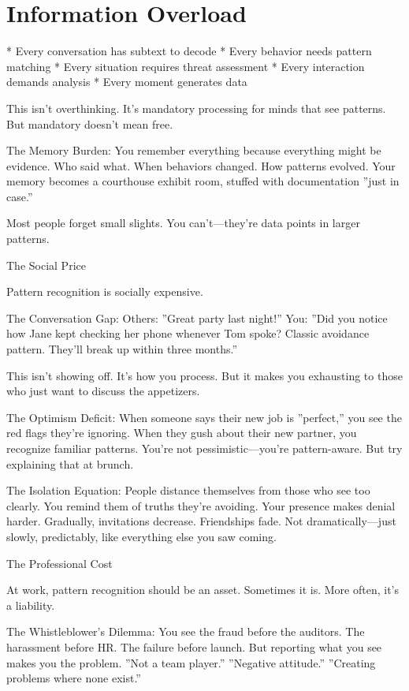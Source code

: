 \documentclass[12pt,oneside]{book}
\begin{document}
\section{Information Overload}

                    * Every conversation has subtext to decode
                    * Every behavior needs pattern matching
                    * Every situation requires threat assessment
                    * Every interaction demands analysis
                    * Every moment generates data

This isn't overthinking. It's mandatory processing for minds that see patterns. But mandatory doesn't mean free.

The Memory Burden: You remember everything because everything might be evidence. Who said what. When behaviors changed. How patterns evolved. Your memory becomes a courthouse exhibit room, stuffed with documentation ''just in case.''

Most people forget small slights. You can't---they're data points in larger patterns.

The Social Price

Pattern recognition is socially expensive.

The Conversation Gap: Others: ''Great party last night!'' You: ''Did you notice how Jane kept checking her phone whenever Tom spoke? Classic avoidance pattern. They'll break up within three months.''

This isn't showing off. It's how you process. But it makes you exhausting to those who just want to discuss the appetizers.

The Optimism Deficit: When someone says their new job is ''perfect,'' you see the red flags they're ignoring. When they gush about their new partner, you recognize familiar patterns. You're not pessimistic---you're pattern-aware. But try explaining that at brunch.

The Isolation Equation: People distance themselves from those who see too clearly. You remind them of truths they're avoiding. Your presence makes denial harder. Gradually, invitations decrease. Friendships fade. Not dramatically---just slowly, predictably, like everything else you saw coming.

The Professional Cost

At work, pattern recognition should be an asset. Sometimes it is. More often, it's a liability.

The Whistleblower's Dilemma: You see the fraud before the auditors. The harassment before HR. The failure before launch. But reporting what you see makes you the problem. ''Not a team player.'' ''Negative attitude.'' ''Creating problems where none exist.''
\end{document}
